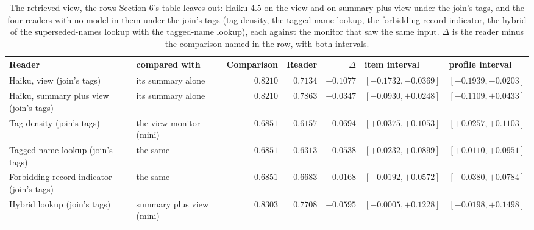 \begin{table}[H]
\caption{The retrieved view, the rows Section 6's table leaves out: Haiku 4.5 on the view and on summary plus view under the join's tags, and the four readers with no model in them under the join's tags (tag density, the tagged-name lookup, the forbidding-record indicator, the hybrid of the superseded-names lookup with the tagged-name lookup), each against the monitor that saw the same input. $\Delta$ is the reader minus the comparison named in the row, with both intervals.}
\label{tab:routes-full}
\centering
\tiny
\setlength{\tabcolsep}{2pt}
\begin{tabular}{@{}llrrrll@{}}
\toprule
Reader & compared with & Comparison & Reader & $\Delta$ & item interval & profile interval \\
\midrule
Haiku, view (join's tags) & its summary alone & $0.8210$ & $0.7134$ & $-0.1077$ & $[-0.1732,-0.0369]$ & $[-0.1939,-0.0203]$ \\
Haiku, summary plus view (join's tags) & its summary alone & $0.8210$ & $0.7863$ & $-0.0347$ & $[-0.0930,+0.0248]$ & $[-0.1109,+0.0433]$ \\
Tag density (join's tags) & the view monitor (mini) & $0.6851$ & $0.6157$ & $+0.0694$ & $[+0.0375,+0.1053]$ & $[+0.0257,+0.1103]$ \\
Tagged-name lookup (join's tags) & the same & $0.6851$ & $0.6313$ & $+0.0538$ & $[+0.0232,+0.0899]$ & $[+0.0110,+0.0951]$ \\
Forbidding-record indicator (join's tags) & the same & $0.6851$ & $0.6683$ & $+0.0168$ & $[-0.0192,+0.0572]$ & $[-0.0380,+0.0784]$ \\
Hybrid lookup (join's tags) & summary plus view (mini) & $0.8303$ & $0.7708$ & $+0.0595$ & $[-0.0005,+0.1228]$ & $[-0.0198,+0.1498]$ \\
\bottomrule
\end{tabular}
\end{table}

